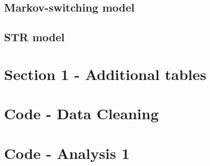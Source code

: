 \documentclass[hidelinks,12pts]{article}
\DeclareMathOperator{\1}{\mathbbm{1}}
\begin{document}
    \subsection{Markov-switching model}\label{sec:markov}

    
    \subsection{STR model}\label{sec:str}



    



\newpage
\newpage
\begin{appendices}

    \section{Section 1 - Additional tables} \label{sec:BIC_tables}
    

    

    

    

    

    

    \newpage
    \section{Code - Data Cleaning} \label{sec:dta_clean}
        
    \newpage
    \section{Code - Analysis 1}
        

\end{appendices}
\end{document}
